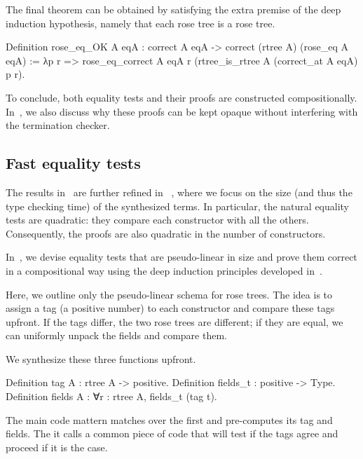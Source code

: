 \documentclass[a4paper, 11pt]{book}
\begin{document}
The final theorem can be obtained by satisfying the extra premise of the deep
induction hypothesis, namely that each rose tree is a rose tree.

\begin{rocqcode}
Definition rose_eq_OK A eqA :
  correct A eqA -> correct (rtree A) (rose_eq A eqA)
:=
  λp r =>
    rose_eq_correct A eqA
      r (rtree_is_rtree A (correct_at A eqA) p r).
\end{rocqcode}


To conclude, both equality tests and their proofs are constructed
compositionally. In~\cite{tassi:hal-01897468}, we also discuss why these proofs
can be kept opaque without interfering with the termination checker.

\subsection{Fast equality tests}

The results in~\cite{tassi:hal-01897468} are further refined in
~\cite{gregoire:hal-03800154}, where we focus on the size (and thus the type
checking time) of the synthesized terms. In particular, the natural equality
tests are quadratic: they compare each constructor with all the others.
Consequently, the proofs are also quadratic in the number of constructors.

In~\cite{gregoire:hal-03800154}, we devise equality tests that are pseudo-linear
in size and prove them correct in a compositional way using the deep induction
principles developed in~\cite{tassi:hal-01897468}.

Here, we outline only the pseudo-linear schema for rose trees. The idea is to
assign a tag (a positive number) to each constructor and compare these tags
upfront. If the tags differ, the two rose trees are different; if they are
equal, we can uniformly unpack the fields and compare them.

We synthesize these three functions upfront.

\begin{rocqcode}
Definition tag A : rtree A -> positive.
Definition fields_t : positive -> Type.
Definition fields A :  ∀r : rtree A, fields_t (tag t).
\end{rocqcode}

The main code mattern matches over the first  and 
pre-computes its tag and fields. The it calls a common piece of
code  that will test if the tags agree and proceed
if it is the case.
\end{document}
